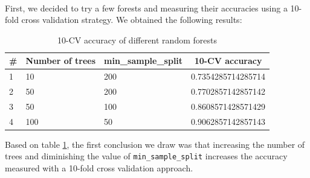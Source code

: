 \documentclass[a4paper, 11pt, oneside]{article}
\begin{document}
\paragraph{}First, we decided to try a few forests and measuring their accuracies using a 10-fold cross validation strategy. We obtained the following results:
\begin{table}[H]
\centering
\begin{tabular}{|l|l|l|l|}
\hline
\multicolumn{1}{|c|}{\textbf{\#}} & \multicolumn{1}{c|}{\textbf{Number of trees}} & \multicolumn{1}{c|}{\textbf{min\_sample\_split}} & \multicolumn{1}{c|}{\textbf{10-CV accuracy}} \\ \hline
1 & 10 & 200 & 0.7354285714285714 \\ \hline
2 & 50 & 200 & 0.7702857142857142 \\ \hline
3 & 50 & 100 & 0.8608571428571429 \\ \hline
4 & 100 & 50 & 0.9062857142857143 \\ \hline
\end{tabular}
\caption{10-CV accuracy of different random forests}
\label{tab:rf-acc}
\end{table}
Based on table \ref{tab:rf-acc}, the first conclusion we draw was that increasing the number of trees and diminishing the value of \texttt{min\_sample\_split} increases the accuracy measured with a 10-fold cross validation approach.
\end{document}
